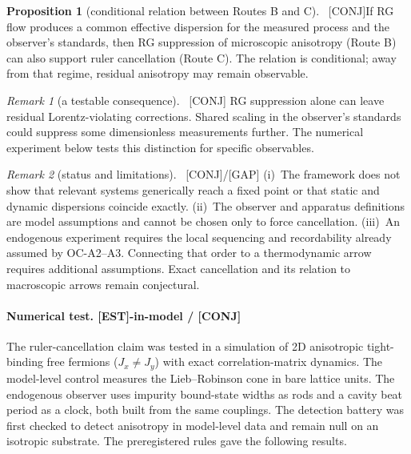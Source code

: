 \documentclass[11pt]{article}
\newcommand{\est}{\textcolor{teal!70!black}{\textsf{\small[EST]}}}
\newcommand{\fields}{\textcolor{violet}{\textsf{\small[FIELDS]}}}
\newcommand{\asm}{\textcolor{blue!70!black}{\textsf{\small[ASM]}}}
\newcommand{\conj}{\textcolor{orange!80!black}{\textsf{\small[CONJ]}}}
\newcommand{\post}{\textcolor{purple!70!black}{\textsf{\small[POST]}}}
\newcommand{\gap}{\textcolor{red!75!black}{\textsf{\small[GAP]}}}
\def\est{[EST]}\def\fields{[FIELDS]}\def\asm{[ASM]}%
\def\conj{[CONJ]}\def\post{[POST]}\def\gap{[GAP]}%
\theoremstyle{definition}
\newtheorem{proposition}{Proposition}[section]
\theoremstyle{remark}
\newtheorem*{remark}{Remark}
\begin{document}
\begin{proposition}[conditional relation between Routes B and C]{\normalfont\ \conj}\label{prop:routes}
If RG flow produces a common effective dispersion for the measured process and the observer's standards, then RG suppression of microscopic anisotropy (Route B) can also support ruler cancellation (Route C). The relation is conditional; away from that regime, residual anisotropy may remain observable.
\end{proposition}

\begin{remark}[a testable consequence]{\normalfont\ \conj}
RG suppression alone can leave residual Lorentz-violating corrections. Shared scaling in the observer's standards could suppress some dimensionless measurements further. The numerical experiment below tests this distinction for specific observables.
\end{remark}

\begin{remark}[status and limitations]{\normalfont\ \conj/\gap}
(i)~The framework does not show that relevant systems generically reach a fixed point or that static and dynamic dispersions coincide exactly. (ii)~The observer and apparatus definitions are model assumptions and cannot be chosen only to force cancellation. (iii)~An endogenous experiment requires the local sequencing and recordability already assumed by OC-A2--A3. Connecting that order to a thermodynamic arrow requires additional assumptions. Exact cancellation and its relation to macroscopic arrows remain conjectural.
\end{remark}

\paragraph{Numerical test. \est-in-model / \conj}
The ruler-cancellation claim was tested in a simulation of 2D anisotropic tight-binding free fermions ($J_x\neq J_y$) with exact correlation-matrix dynamics. The model-level control measures the Lieb--Robinson cone in bare lattice units. The endogenous observer uses impurity bound-state widths as rods and a cavity beat period as a clock, both built from the same couplings. The detection battery was first checked to detect anisotropy in model-level data and remain null on an isotropic substrate. The preregistered rules gave the following results.
\end{document}
